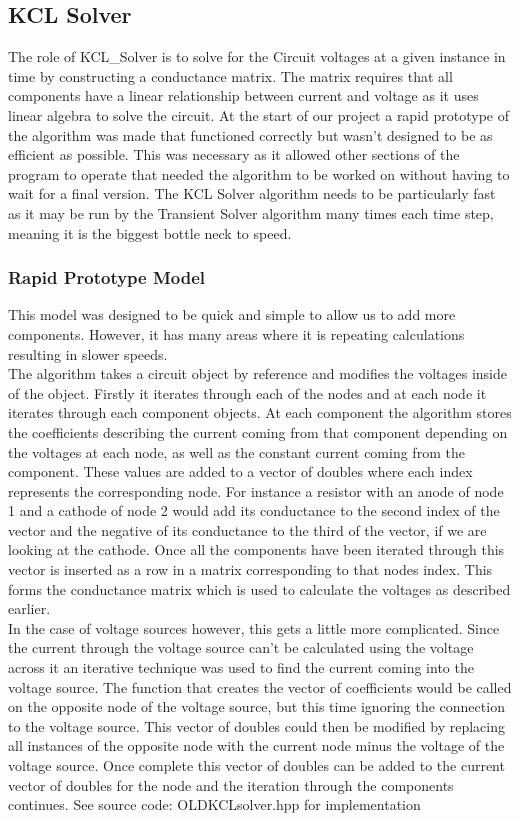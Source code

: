 \documentclass{article}
\begin{document}
\subsection{KCL Solver}\label{KCLsolver}
The role of KCL\_Solver is to solve for the Circuit voltages at a given instance in time by constructing a conductance matrix. The matrix requires that all components have a linear relationship between current and voltage as it uses linear algebra to solve the circuit. At the start of our project a rapid prototype of the algorithm was made that functioned correctly but wasn't designed to be as efficient as possible. This was necessary as it allowed other sections of the program to operate that needed the algorithm to be worked on without having to wait for a final version. The KCL Solver algorithm needs to be particularly fast as it may be run by the Transient Solver algorithm many times each time step, meaning it is the biggest bottle neck to speed.
\subsubsection{Rapid Prototype Model}
This model was designed to be quick and simple to allow us to add more components. However, it has many areas where it is repeating calculations resulting in slower speeds.\\ The algorithm takes a circuit object by reference and modifies the voltages inside of the object. Firstly it iterates through each of the nodes and at each node it iterates through each component objects. At each component the algorithm stores the coefficients describing the current coming from that component depending on the voltages at each node, as well as the constant current coming from the component. These values are added to a vector of doubles where each index represents the corresponding node. For instance a resistor with an anode of node 1 and a cathode of node 2 would add its conductance to the second index of the vector and the negative of its conductance to the third of the vector, if we are looking at the cathode. Once all the components have been iterated through this vector is inserted as a row in a matrix corresponding to that nodes index. This forms the conductance matrix which is used to calculate the voltages as described earlier.\\
In the case of voltage sources however, this gets a little more complicated. Since the current through the voltage source can't be calculated using the voltage across it an iterative technique was used to find the current coming into the voltage source. The function that creates the vector of coefficients would be called on the opposite node of the voltage source, but this time ignoring the connection to the voltage source. This vector of doubles could then be modified by replacing all instances of the opposite node with the current node minus the voltage of the voltage source. Once complete this vector of doubles can be added to the current vector of doubles for the node and the iteration through the components continues. 
\bigbreak
See source code: OLDKCLsolver.hpp for implementation
\newpage
\end{document}
